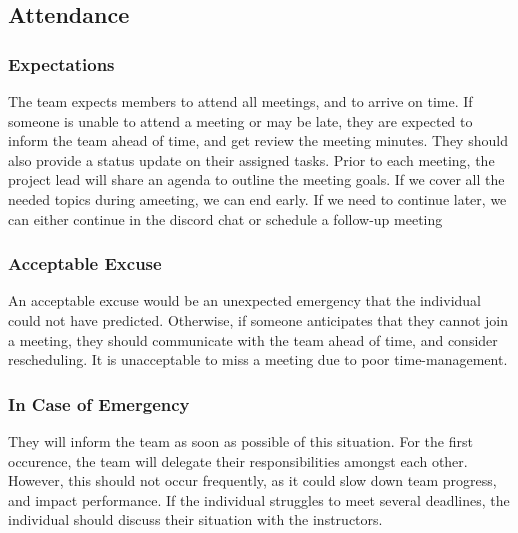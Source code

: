 \documentclass{article}
\begin{document}
\subsection*{Attendance}

\subsubsection*{Expectations}

\begin{comment}
\wss{What are your team's expectations regarding meeting attendance (being on
time, leaving early, missing meetings, etc.)?}
\end{comment}
The team expects members to attend all meetings, and to arrive on time. If someone is unable to attend a meeting or may be late, they are expected to inform the team ahead of time, and get review the meeting minutes. They should also provide a status update on their assigned tasks. Prior to each meeting, the project lead will share an agenda to outline the meeting goals. If we cover all the needed topics during ameeting, we can end early. If we need to continue later, we can either continue in the discord chat or schedule a follow-up meeting

\subsubsection*{Acceptable Excuse}

\begin{comment}
\wss{What constitutes an acceptable excuse for missing a meeting or a deadline?
What types of excuses will not be considered acceptable?}
\end{comment}
An acceptable excuse would be an unexpected emergency that the individual could not have predicted. Otherwise, if someone anticipates that they cannot join a meeting, they should communicate with the team ahead of time, and consider rescheduling. It is unacceptable to miss a meeting due to poor time-management.

\subsubsection*{In Case of Emergency}

\begin{comment}
\wss{What process will team members follow if they have an emergency and cannot
attend a team meeting or complete their individual work promised for a team
deliverable?}
\end{comment}
They will inform the team as soon as possible of this situation. For the first occurence, the team will delegate their responsibilities amongst each other. However, this should not occur frequently, as it could slow down team progress, and impact performance. If the individual struggles to meet several deadlines, the individual should discuss their situation with the instructors.
\end{document}
